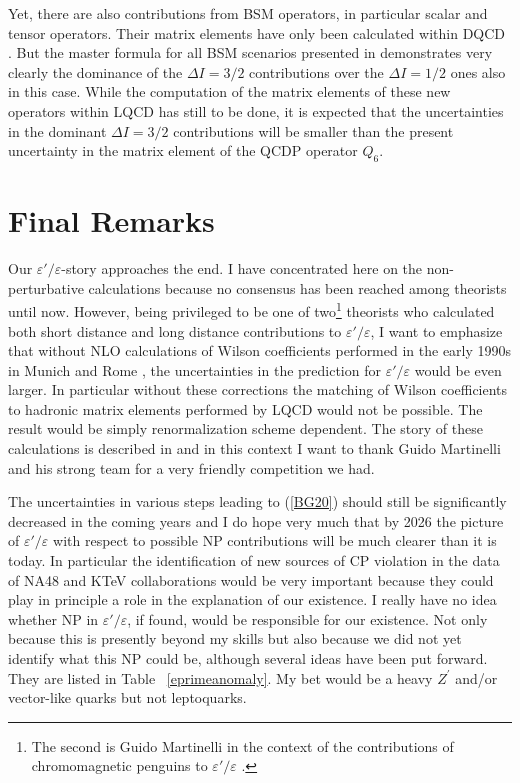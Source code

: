 \documentclass[12pt,a4paper]{article}
\def\epe{\varepsilon'/\varepsilon}
\begin{document}
Yet,  there are also contributions from BSM operators, in particular scalar
and tensor operators. Their matrix elements have only been calculated within
DQCD \cite{Aebischer:2018rrz}. But the master formula for all BSM scenarios
presented in \cite{Aebischer:2018quc,Aebischer:2018csl} demonstrates very clearly the dominance of the $\Delta I=3/2$
contributions over the $\Delta I=1/2$ ones also in this case. While the computation of the matrix elements of these new operators within LQCD has still to be done, it is expected
that the uncertainties in the dominant $\Delta I=3/2$ contributions will
be smaller than the present uncertainty in the matrix element of the QCDP operator $Q_6$.


\boldmath
\section{Final Remarks}
\unboldmath
Our $\epe$-story approaches the end. I have concentrated here on the non-perturbative calculations because no consensus has been reached among theorists until now. However, being privileged to be one of two\footnote{The second is Guido Martinelli in the context of the contributions of chromomagnetic penguins to $\epe$
\cite{Constantinou:2017sgv}.}   
theorists who calculated both short distance and long distance contributions to $\epe$, I want to emphasize that without NLO calculations of Wilson coefficients performed in the early 1990s in Munich
\cite{Buras:1991jm,Buras:1992tc,Buras:1992zv,Buras:1993dy} and Rome \cite{Ciuchini:1992tj,Ciuchini:1993vr}, the uncertainties in the prediction for $\epe$ would
be even larger. In particular without these corrections the matching of Wilson coefficients to hadronic matrix elements performed by LQCD would not be possible.
The result would be simply renormalization scheme dependent.
The story of these calculations is described  in \cite{Buras:2011we} and in
this context I want to thank Guido Martinelli and his strong team
for a very friendly competition we had. 



The uncertainties in various steps leading
to (\ref{BG20}) should still be significantly decreased in the coming years
and I do hope very much that by 2026 the picture of $\epe$ with respect to possible NP contributions will be much clearer than it is today. In particular 
the  identification of new sources of CP violation in the data of
NA48 and KTeV collaborations would be very important because they could play in principle a role in the explanation of our  existence.   I really have no idea whether NP in $\epe$, if found, would be  responsible for our existence. Not only because this is presently beyond my  skills but also because we did not yet identify what this NP could be, although several ideas have been put forward. They are listed in Table~ \ref{eprimeanomaly}. My bet would be a heavy $Z^\prime$ and/or vector-like quarks but
not leptoquarks.
\end{document}
